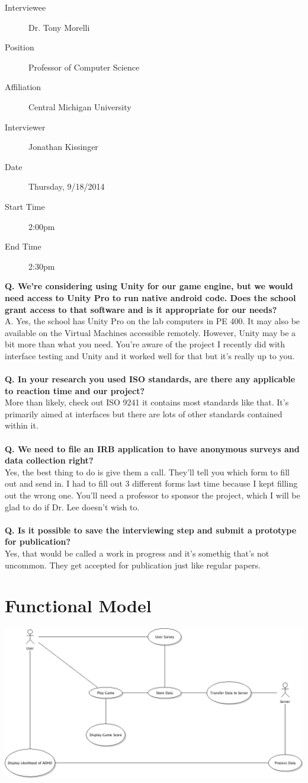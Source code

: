 \documentclass[a4wide]{article}
\begin{document}
\begin{description}
\item[Interviewee] Dr. Tony Morelli
\item[Position] Professor of Computer Science
\item[Affiliation] Central Michigan University
\item[Interviewer] Jonathan Kissinger
\item[Date] Thursday, 9/18/2014
\item[Start Time] 2:00pm
\item[End Time] 2:30pm
\end{description}
\textbf{Q. We’re considering using Unity for our game engine, but we would need
access to Unity Pro to run native android code.  Does the school grant access to
that software and is it appropriate for our needs?}\\
A. Yes, the school has Unity Pro on the lab computers in PE 400.  It may also be
available on the Virtual Machines accessible remotely.  However, Unity may be a
bit more than what you need.  You’re aware of the project I recently did with
interface testing and Unity and it worked well for that but it’s really up to
you.\\\\
\textbf{Q. In your research you used ISO standards, are there any applicable to
reaction time and our project?}\\
More than likely, check out ISO 9241 it contains most standards like that.  It’s
primarily aimed at interfaces but there are lots of other standards contained
within it.\\\\
\textbf{Q. We need to file an IRB application to have anonymous surveys and data
collection right?}\\
Yes, the best thing to do is give them a call.  They’ll tell you which form to
fill out and send in.  I had to fill out 3 different forms last time because I
kept filling out the wrong one.  You’ll need a professor to sponsor the project,
which I will be glad to do if Dr. Lee doesn’t wish to.\\\\
\textbf{Q. Is it possible to save the interviewing step and submit a prototype
for publication?}\\
Yes, that would be called a work in progress and it's somethig that's not
uncommon.  They get accepted for publication just like regular papers.

\section{Functional Model}
\includegraphics[width=\textwidth]{UseCaseDiagram.png}
\end{document}
